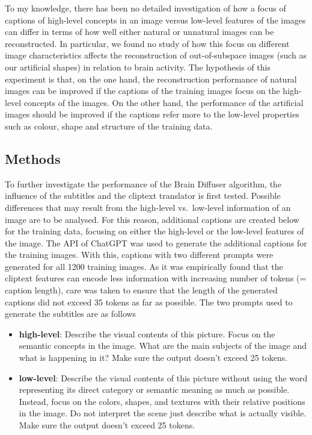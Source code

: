 To my knowledge, there has been no detailed investigation of how a focus of captions of high-level concepts in an image versus low-level features of the images can differ in terms of how well either natural or unnatural images can be reconstructed. In particular, we found no study of how this focus on different image characteristics affects the reconstruction of out-of-subspace images (such as our artificial shapes) in relation to brain activity. The hypothesis of this experiment is that, on the one hand, the reconstruction performance of natural images can be improved if the captions of the training images focus on the high-level concepts of the images. On the other hand, the performance of the artificial images should be improved if the captions refer more to the low-level properties such as colour, shape and structure of the training data.


\subsection{Methods}
To further investigate the performance of the Brain Diffuser algorithm, the influence of the subtitles and the cliptext translator is first tested. Possible differences that may result from the high-level vs.\ low-level information of an image are to be analysed. For this reason, additional captions are created below for the training data, focusing on either the high-level or the low-level features of the image. The API of ChatGPT\cite{OpenAI_ChatGPT_2024} was used to generate the additional captions for the training images. With this, captions with two different prompts were generated for all 1200 training images. As it was empirically found that the cliptext features can encode less information with increasing number of tokens (= caption length)\cite{zhangLongCLIPUnlockingLongText2024}, care was taken to ensure that the length of the generated captions did not exceed 35 tokens as far as possible. The two prompts used to generate the subtitles are as follows
\begin{itemize}
    \item \textbf{high-level}: Describe the visual contents of this picture. Focus on the semantic concepts in the image. What are the main subjects of the image and what is happening in it? Make sure the output doesn't exceed 25 tokens.
    \item \textbf{low-level}: Describe the visual contents of this picture without using the word representing its direct category or semantic meaning as much as possible. Instead, focus on the colors, shapes, and textures with their relative positions in the image. Do not interpret the scene just describe what is actually visible. Make sure the output doesn't exceed 25 tokens.
\end{itemize}

